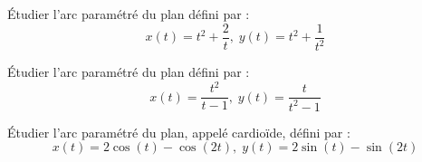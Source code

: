 \documentclass[a4paper,twoside,french,11pt]{VcCours}
\begin{document}



%

%
%
%
%
%
%
%
%
%
%

\begin{Exercice}{} Étudier l'arc paramétré du plan défini par :
$$ x(t) = t^2+ \dfrac{2}{t}, \; y(t) = t^2+\dfrac{1}{t^2} $$
\end{Exercice}

\begin{Exercice}{} Étudier l'arc paramétré du plan défini par :
$$ x(t) = \dfrac{t^2}{t-1}, \; y(t) = \dfrac{t}{t^2-1} $$
\end{Exercice}

\begin{Exercice}{} Étudier l'arc paramétré du plan, appelé cardioïde,  défini par :
$$ x(t) = 2 \cos(t) - \cos(2t), \; y(t) = 2 \sin(t) - \sin(2t) $$
\end{Exercice} 
\end{document}
